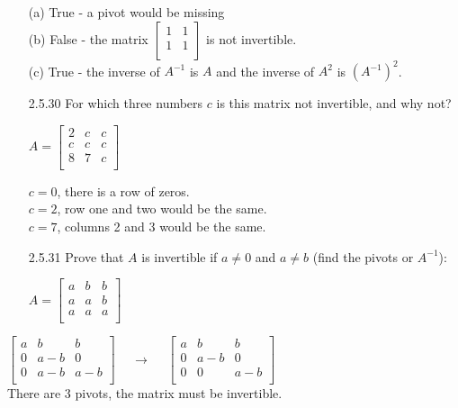 \documentclass[10pt,twoside,reqno]{article}
\begin{document}
\begin{enumerate}
(a) True - a pivot would be missing \\
(b) False - the matrix 
$
$$
\begin{bmatrix}
1&1 \\
1&1 \\
\end{bmatrix}
$$
$
 is not invertible. \\
(c) True - the inverse of $A^{-1}$ is $A$ and the inverse of $A^2$ is $(A^{-1})^2$. \\
\vspace{3mm}
\item[2.5.30] For which three numbers $c$ is this matrix not invertible, and why not?\\
\begin{center}
$
$$
A=
\begin{bmatrix}
2&c&c\\
c&c&c\\
8&7&c\\
\end{bmatrix}
$$
$
\end{center}
\vspace{3mm}
\hspace{75pt}$c=0$, there is a row of zeros. \\
\hspace{75pt}$c=2$, row one and two would be the same. \\
\hspace{75pt}$c=7$, columns 2 and 3 would be the same. \\
\vspace{3mm}
\item[2.5.31] Prove that $A$ is invertible if $a\neq 0$ and $a \neq b$ (find the pivots or $A^{-1}$):\\
\begin{center}
$
$$
A=
\begin{bmatrix}
a&b&b\\
a&a&b\\
a&a&a\\
\end{bmatrix}
$$
$
\end{center}
\end{enumerate}
\vspace{3mm}
\begin{center}
$
$$
\begin{bmatrix}
a&b&b\\
0&a-b&0\\
0&a-b&a-b\\
\end{bmatrix}
\hspace{15pt} \rightarrow \hspace{15pt}
\begin{bmatrix}
a&b&b\\
0&a-b&0\\
0&0&a-b\\
\end{bmatrix}
$$
$ \\
\vspace{2mm}
There are 3 pivots, the matrix must be invertible. \\
\end{center}
\end{document}
